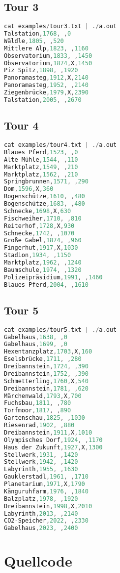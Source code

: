 \documentclass[a4paper,10pt,ngerman]{scrartcl}
\begin{document}
\subsection*{Tour 3}
\begin{lstlisting}[language=C++]
cat examples/tour3.txt | ./a.out
Talstation,1768, ,0
Wäldle,1805, ,520
Mittlere Alp,1823, ,1160
Observatorium,1833, ,1450
Observatorium,1874,X,1450
Piz Spitz,1898, ,1920
Panoramasteg,1912,X,2140
Panoramasteg,1952, ,2140
Ziegenbrücke,1979,X,2390
Talstation,2005, ,2670
\end{lstlisting}

\subsection*{Tour 4}
\begin{lstlisting}[language=C++]
cat examples/tour4.txt | ./a.out
Blaues Pferd,1523, ,0
Alte Mühle,1544, ,110
Marktplatz,1549, ,210
Marktplatz,1562, ,210
Springbrunnen,1571, ,290
Dom,1596,X,360
Bogenschütze,1610, ,480
Bogenschütze,1683, ,480
Schnecke,1698,X,630
Fischweiher,1710, ,810
Reiterhof,1728,X,930
Schnecke,1742, ,1070
Große Gabel,1874, ,960
Fingerhut,1917,X,1030
Stadion,1934, ,1150
Marktplatz,1962, ,1240
Baumschule,1974, ,1320
Polizeipräsidium,1991, ,1460
Blaues Pferd,2004, ,1610
\end{lstlisting}

\subsection*{Tour 5}
\begin{lstlisting}[language=C++]
cat examples/tour5.txt | ./a.out
Gabelhaus,1638, ,0
Gabelhaus,1699, ,0
Hexentanzplatz,1703,X,160
Eselsbrücke,1711, ,280
Dreibannstein,1724, ,390
Dreibannstein,1752, ,390
Schmetterling,1760,X,540
Dreibannstein,1781, ,620
Märchenwald,1793,X,700
Fuchsbau,1811, ,780
Torfmoor,1817, ,890
Gartenschau,1825, ,1030
Riesenrad,1902, ,880
Dreibannstein,1911,X,1010
Olympisches Dorf,1924, ,1170
Haus der Zukunft,1927,X,1300
Stellwerk,1931, ,1420
Stellwerk,1942, ,1420
Labyrinth,1955, ,1630
Gauklerstadl,1961, ,1710
Planetarium,1971,X,1790
Känguruhfarm,1976, ,1840
Balzplatz,1978, ,1920
Dreibannstein,1998,X,2010
Labyrinth,2013, ,2140
CO2-Speicher,2022, ,2330
Gabelhaus,2023, ,2400
\end{lstlisting}

\pagebreak


\section{Quellcode}
\end{document}
